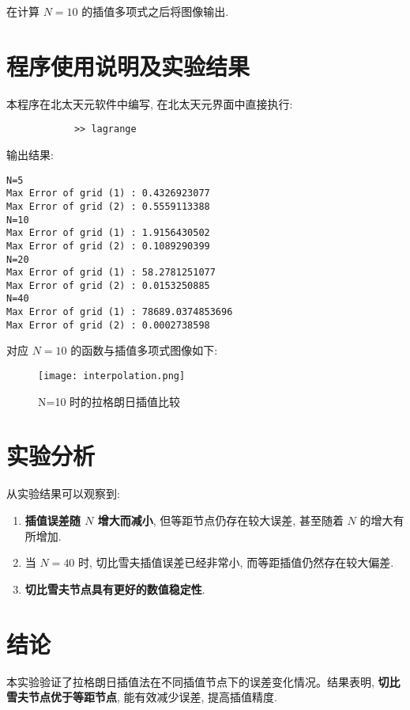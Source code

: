 \documentclass[12pt]{article}
\begin{document}
		在计算 $N = 10$ 的插值多项式之后将图像输出.

	\section{程序使用说明及实验结果}
		本程序在北太天元软件中编写, 在北太天元界面中直接执行:
		\begin{verbatim}
			>> lagrange
		\end{verbatim}
		输出结果:
		\begin{verbatim}
N=5
Max Error of grid (1) : 0.4326923077
Max Error of grid (2) : 0.5559113388
N=10
Max Error of grid (1) : 1.9156430502
Max Error of grid (2) : 0.1089290399
N=20
Max Error of grid (1) : 58.2781251077
Max Error of grid (2) : 0.0153250885
N=40
Max Error of grid (1) : 78689.0374853696
Max Error of grid (2) : 0.0002738598
		\end{verbatim}

		对应 $N = 10$ 的函数与插值多项式图像如下:
		\begin{figure}[htbp]
			\centering
			\texttt{[image: interpolation.png]}
			\caption{N=10 时的拉格朗日插值比较}
			\label{fig:interpolation}
		\end{figure}

	\section{实验分析}
	从实验结果可以观察到:
	\begin{enumerate}
		\item \textbf{插值误差随 $N$ 增大而减小}, 但等距节点仍存在较大误差, 甚至随着 $N$ 的增大有所增加.
		\item 当 $N = 40$ 时, 切比雪夫插值误差已经非常小, 而等距插值仍然存在较大偏差.
		\item \textbf{切比雪夫节点具有更好的数值稳定性}.
	\end{enumerate}

	\section{结论}
	本实验验证了拉格朗日插值法在不同插值节点下的误差变化情况。结果表明, \textbf{切比雪夫节点优于等距节点}, 能有效减少误差, 提高插值精度.
\end{document}
